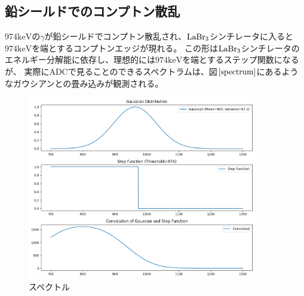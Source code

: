 \documentclass[dvipdfmx]{jreport}
\begin{document}
\subsection{鉛シールドでのコンプトン散乱}
$974\mathrm{keV}$の$\gamma$が鉛シールドでコンプトン散乱され、$\ce{LaBr_{3}}$シンチレータに入ると$974\mathrm{keV}$を端とするコンプトンエッジが現れる。
この形は$\ce{LaBr_{3}}$シンチレータのエネルギー分解能に依存し、理想的には$974\mathrm{keV}$を端とするステップ関数になるが、
実際にADCで見ることのできるスペクトラムは、図$\ref{spectrum}$にあるようなガウシアンとの畳み込みが観測される。
\begin{figure}[htbp]
  \centering
  \includegraphics[width=100mm]{figure/spectrum.png}
  \caption{スペクトル \label{spectrum}}
\end{figure}
\end{document}
